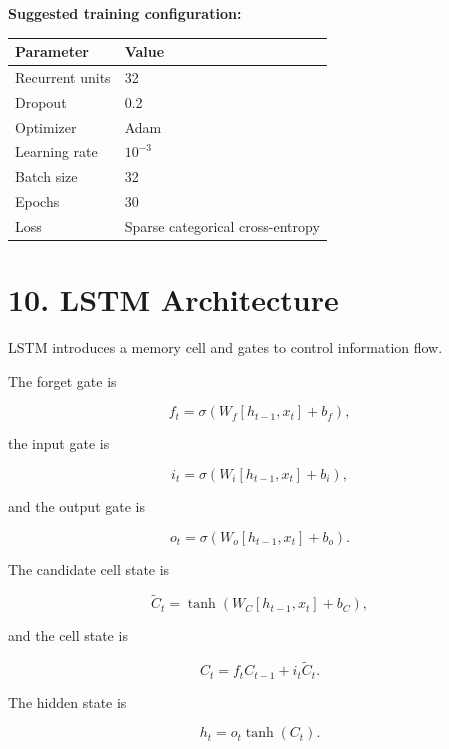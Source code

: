 \documentclass[10pt]{article}
\begin{document}
\textbf{Suggested training configuration:}

\begin{center}
\begin{tabular}{|l|l|}
\hline
Parameter & Value\\
\hline
Recurrent units & 32\\
Dropout & 0.2\\
Optimizer & Adam\\
Learning rate & $10^{-3}$\\
Batch size & 32\\
Epochs & 30\\
Loss & Sparse categorical cross-entropy\\
\hline
\end{tabular}
\end{center}

\section*{10. LSTM Architecture}

LSTM introduces a memory cell and gates to control information flow.

The forget gate is

\[
f_t=\sigma(W_f[h_{t-1},x_t]+b_f),
\]

the input gate is

\[
i_t=\sigma(W_i[h_{t-1},x_t]+b_i),
\]

and the output gate is

\[
o_t=\sigma(W_o[h_{t-1},x_t]+b_o).
\]

The candidate cell state is

\[
\tilde{C}_t=
\tanh(W_C[h_{t-1},x_t]+b_C),
\]

and the cell state is

\[
C_t=f_tC_{t-1}+i_t\tilde{C}_t.
\]

The hidden state is

\[
h_t=o_t\tanh(C_t).
\]

\begin{center}
\end{center}
\end{document}
